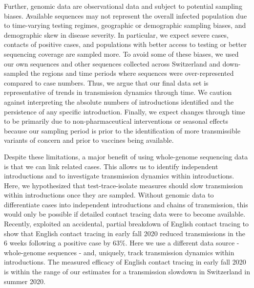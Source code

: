 \documentclass[11pt,twoside,lineno]{pnas-new} %
\begin{document}
Further, genomic data are observational data and subject to potential sampling biases. Available sequences may not represent the overall infected population due to time-varying testing regimes, geographic or demographic sampling biases, and demographic skew in disease severity. In particular, we expect severe cases, contacts of positive cases, and populations with better access to testing or better sequencing coverage are sampled more. To avoid some of these biases, we used our own sequences and other sequences collected across Switzerland and down-sampled the regions and time periods where sequences were over-represented compared to case numbers. Thus, we argue that our final data set is representative of trends in transmission dynamics through time. We caution against interpreting the absolute numbers of introductions identified and the persistence of any specific introduction. Finally, we expect changes through time to be primarily due to non-pharmaceutical interventions or seasonal effects because our sampling period is prior to the identification of more transmissible variants of concern and prior to vaccines being available. 

Despite these limitations, a major benefit of using whole-genome sequencing data is that we can link related cases. This allows us to identify independent introductions and to investigate transmission dynamics within introductions. Here, we hypothesized that test-trace-isolate measures should slow transmission within introductions once they are sampled. Without genomic data to differentiate cases into independent introductions and chains of transmission, this would only be possible if detailed contact tracing data were to become available. Recently, \cite{Fetzer2021} exploited an accidental, partial breakdown of English contact tracing to show that English contact tracing in early fall 2020 reduced transmissions in the 6 weeks following a positive case by 63\%. Here we use a different data source - whole-genome sequences - and, uniquely, track transmission dynamics within introductions. The measured efficacy of English contact tracing in early fall 2020 is within the range of our estimates for a transmission slowdown in Switzerland in summer 2020.
\end{document}
